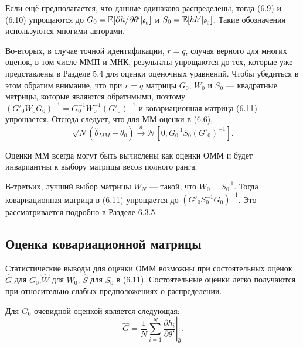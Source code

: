 Если ещё предполагается, что данные одинаково распределены, тогда (6.9) и (6.10) упрощаются до $G_0=\mathbb{E}[\partial h/ \partial \theta'|_{\theta_0}]$ и $S_0=\mathbb{E}[hh'|_{\theta_0}]$. Такие обозначения используются многими авторами.

Во-вторых, в случае точной идентификации, $r=q$, случая верного для многих оценок, в том числе ММП и МНК, результаты упрощаются до тех, которые уже представлены в Разделе 5.4 для оценки оценочных уравнений. Чтобы убедиться в этом обратим внимание, что при $r=q$ матрицы $G_0$, $W_0$ и $S_0$ --- квадратные матрицы, которые являются обратимыми, поэтому $(G'_0 W_0 G_0)^{-1} = G^{-1}_0 W^{-1}_0 {(G'_0)}^{-1}$ и ковариационная матрица (6.11) упрощается. Отсюда следует, что для ММ оценки в (6.6), 
\begin{equation}
\sqrt{N} (\hat{\theta}_{MM}-\theta_0) \xrightarrow{d} \mathcal{N}[0,{G}^{-1}_0 S_0 (G'_0)^{-1}].
\end{equation}

Оценки ММ всегда могут быть вычислены как оценки ОММ и будет инвариантны к выбору матрицы весов полного ранга.

В-третьих, лучший выбор матрицы $W_N$ --- такой, что $W_0=S^{-1}_0$. Тогда ковариационная
матрица в (6.11) упрощается до $(G'_0 S^{-1}_0 G_0)^{-1}$. Это рассматривается подробно в Разделе 6.3.5.

\subsection{Оценка ковариационной матрицы}

Статистические выводы для оценки ОММ возможны при состоятельных оценок $\hat{G}$ для $G_0$,$\hat{W}$ для $W_0$, $\hat{S}$ для $S_0$ в (6.11). Состоятельные оценки легко получаются при относительно слабых предположениях о распределении.

Для $G_0$ очевидной оценкой является следующая:
\begin{equation}
\hat{G}=\frac{1}{N} \left. \sum_{i=1}^{N} \frac{\partial h_i}{\partial \theta'} \right|_{\hat{\theta}}.
\end{equation}

